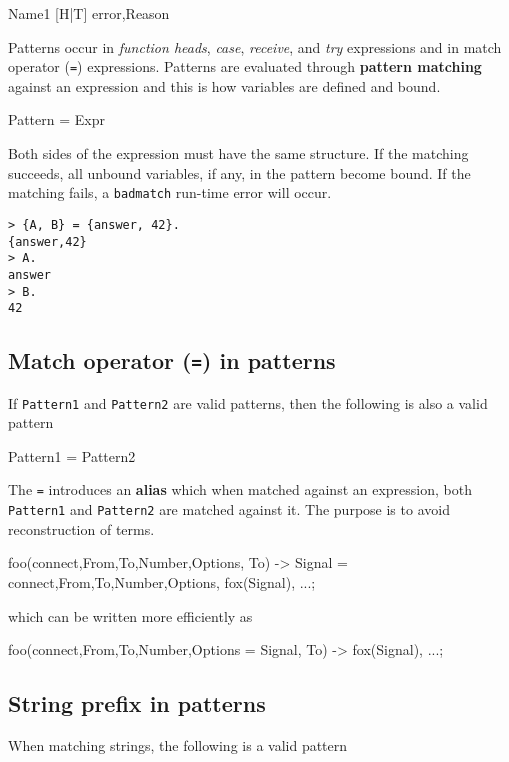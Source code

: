 \begin{erlang}
Name1
[H|T]
{error,Reason}
\end{erlang}

Patterns occur in \textit{function heads}, \textit{case},
\textit{receive}, and \textit{try} expressions and in match operator
(\texttt{=}) expressions. Patterns are evaluated through
\textbf{pattern matching} against an expression and this is how
variables are defined and bound.

\begin{erlang}
Pattern = Expr
\end{erlang}

Both sides of the expression must have the same structure. If the
matching succeeds, all unbound variables, if any, in the pattern
become bound. If the matching fails, a \texttt{badmatch} run-time
error will occur.


\begin{verbatim}
> {A, B} = {answer, 42}.
{answer,42}
> A.
answer
> B.
42
\end{verbatim}

\subsection{Match operator (\texttt{=}) in patterns}
If \texttt{Pattern1} and \texttt{Pattern2} are valid patterns, then
the following is also a valid pattern

\begin{erlang}
Pattern1 = Pattern2
\end{erlang}

The \texttt{=} introduces an \textbf{alias} which when matched against an
expression, both \texttt{Pattern1} and \texttt{Pattern2} are matched
against it. The purpose is to avoid reconstruction of terms.

\begin{erlang}
foo({connect,From,To,Number,Options}, To) ->
    Signal = {connect,From,To,Number,Options},
    fox(Signal),
    ...;
\end{erlang}

which can be written more efficiently as

\begin{erlang}
foo({connect,From,To,Number,Options} = Signal, To) ->
    fox(Signal),
    ...;
\end{erlang}


\subsection{String prefix in patterns}
When matching strings, the following is a valid pattern

